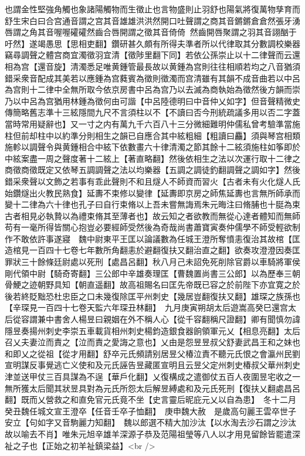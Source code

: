 也謂金性堅強角觸也象諸陽觸物而生徵止也言物盛則止羽舒也陽氣將復萬物孳育而舒生宋白曰合宫通音謂之宫其音雄雄洪洪然開口吐聲謂之商其音鏘鏘倉倉然張牙湧唇謂之角其音喔喔礭礭然齒合唇開謂之徵其音倚倚然齒開唇聚謂之羽其音詡酗于吁然】遂竭愚思【思相吏翻】鑽研甚久頗有所得夫準者所以代律取其分數調校樂器竊尋調聲之體宫商宜濁徵羽宜清【徵陟里翻下同】若依公孫崇止以十二律聲而云還相為宫【還音旋】清濁悉足唯黄鍾管最長故以黄鍾為宫則往往相順若均之八音猶須錯采衆音配成其美若以應鍾為宫蕤賓為徵則徵濁而宫清雖有其韻不成音曲若以中呂為宫則十二律中全無所取今依京房書中呂為宫乃以去滅為商執始為徵然後方韻而崇乃以中呂為宫猶用林鍾為徵何由可諧【中呂陸德明曰中音仲乂如字】但音聲精微史傳簡略舊志準十三絃隱間九尺不言須柱以不【不讀曰否今刑統疏議多用以否二字蓋當時常用疑辭也】又一寸之内有萬九千六百八十三分微細難明仲儒私曾考驗準當施柱但前却柱中以約準分則相生之韻已自應合其中絃粗細【粗讀曰麤】須與琴宫相類施軫以調聲令與黄鍾相合中絃下依數畫六十律清濁之節其餘十二絃須施柱如筝即於中絃案盡一周之聲度著十二絃上【著直略翻】然後依相生之法以次運行取十二律之商徵商徵既定又依琴五調調聲之法以均樂器【五調之調徒釣翻調聲之調如字】然後錯采衆聲以文飾之若事有乖此聲則不和且燧人不師資而習火【古者未有火化燧人氏始鑽燧出火教民熟食】延夀不束修以變律【延夀即京房之師焦延夀也言無所師承而變十二律為六十律也孔子曰自行束脩以上吾未嘗無誨焉朱元晦注曰脩脯也十脡為束古者相見必執贄以為禮束脩其至薄者也】故云知之者欲教而無從心達者體知而無師苟有一毫所得皆關心抱豈必要經師受然後為奇哉尚書蕭寶寅奏仲儒學不師受輕欲制作不敢依許事遂寢　魏中尉東平王匡以論議數為任城王澄所奪憤恚復治其故棺【匡造棺見一百四十七卷七年數所角翻恚於避翻復扶又翻治直之翻】欲奏攻澄澄因奏匡罪狀三十餘條廷尉處以死刑【處昌呂翻】秋八月己未詔免死削除官爵以車騎將軍侯剛代領中尉【騎奇寄翻】三公郎中辛雄奏理匡【曹魏置尚書三公郎】以為歷奉三朝骨鯁之迹朝野具知【朝直遥翻】故高祖賜名曰匡先帝既已容之於前陛下亦宜寛之於後若終貶黜恐杜忠臣之口未幾復除匡平州刺史【幾居豈翻復扶又翻】雄琛之族孫也【辛琛見一百四十七卷天監六年琛丑林翻】　九月庚寅朔胡太后遊嵩高癸巳還宫太后從容謂兼中書舍人楊昱曰親姻在外不稱人心【從千容翻稱尺證翻】卿有聞慎勿諱隱昱奏揚州刺史李崇五車載貨相州刺史楊鈞造銀食器餉領軍元乂【相息亮翻】太后召乂夫妻泣而責之【泣而責之愛誨之意也】乂由是怨昱昱叔父舒妻武昌王和之妹也和即乂之從祖【從才用翻】舒卒元氏頻請别居昱父椿泣責不聽元氏恨之會瀛州民劉宣明謀反事覺逃亡义使和及元氏誣告昱藏匿宣明且云昱父定州刺史椿叔父華州刺史津並送甲仗三百具謀為不逞【華戶化翻】乂復構成之遣御仗五百人夜圍昱宅收之一無所獲太后聞其狀昱具對為元氏所怨太后解昱縛處和及元氏死刑【復扶乂翻處昌呂翻】既而乂營救之和直免官元氏竟不坐【史言靈后昵庇元乂以自為患】　冬十二月癸丑魏任城文宣王澄卒【任音壬卒子恤翻】　庚申魏大赦　是歲高句麗王雲卒世子安立【句如字又音駒麗力知翻】　魏以郎選不精大加沙汰【以水淘去沙石謂之沙汰故以喻去不肖】唯朱元旭辛雄羊深源子恭及范陽祖瑩等八人以才用見留餘皆罷遣深祉之子也【正始之初羊祉鎮梁益】<br />

